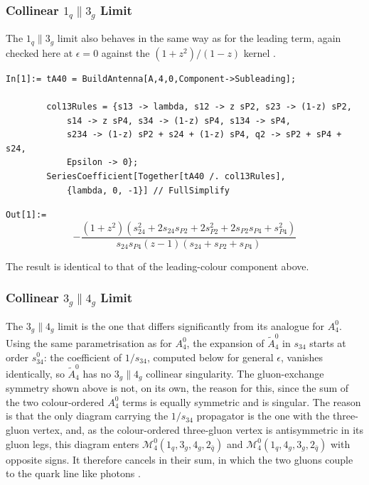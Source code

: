 \subsubsection{Collinear $1_q\parallel 3_g$ Limit}

The $1_q\parallel 3_g$ limit also behaves in the same way as for the leading term, again checked here at
$\epsilon=0$ against the $(1+z^2)/(1-z)$ kernel \cite{Gehrmann-DeRidder:2005btv}.

\begin{mdframed}[backgroundcolor=gray!10, linewidth=0pt]
\begin{lstlisting}
In[1]:= tA40 = BuildAntenna[A,4,0,Component->Subleading];

        col13Rules = {s13 -> lambda, s12 -> z sP2, s23 -> (1-z) sP2,
            s14 -> z sP4, s34 -> (1-z) sP4, s134 -> sP4,
            s234 -> (1-z) sP2 + s24 + (1-z) sP4, q2 -> sP2 + sP4 + s24,
            Epsilon -> 0};
        SeriesCoefficient[Together[tA40 /. col13Rules],
            {lambda, 0, -1}] // FullSimplify
\end{lstlisting}
\texttt{Out[1]:=}
    \begin{equation*}
        -\frac{(1+z^2)\left(s_{24}^2+2s_{24}s_{P2}+2s_{P2}^2+2s_{P2}s_{P4}+s_{P4}^2\right)}{s_{24}s_{P4}(z-1)(s_{24}+s_{P2}+s_{P4})}
    \end{equation*}
\end{mdframed}
The result is identical to that of the leading-colour component above.


\subsubsection{Collinear $3_g\parallel 4_g$ Limit}

The $3_g\parallel 4_g$ limit is the one that differs significantly from its analogue for $A_4^0$. Using the
same parametrisation as for $A_4^0$, the expansion of $\tilde A_4^0$ in $s_{34}$ starts at order
$s_{34}^0$: the coefficient of $1/s_{34}$, computed below for general $\epsilon$, vanishes identically,
so $\tilde A_4^0$ has no $3_g\parallel 4_g$ collinear singularity. The gluon-exchange symmetry shown above is
not, on its own, the reason for this, since the sum of the two colour-ordered $A_4^0$ terms is equally
symmetric and is singular. The reason is that the only diagram carrying the $1/s_{34}$ propagator is
the one with the three-gluon vertex, and, as the colour-ordered three-gluon vertex is antisymmetric
in its gluon legs, this diagram enters $\mathcal M_4^0(1_q,3_g,4_g,2_{\bar q})$ and
$\mathcal M_4^0(1_q,4_g,3_g,2_{\bar q})$ with opposite signs. It therefore cancels in their sum, in
which the two gluons couple to the quark line like photons \cite{Gehrmann-DeRidder:2005btv}.

